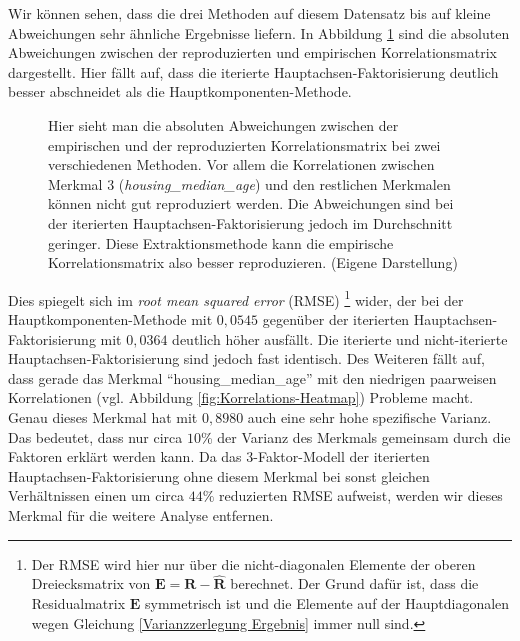 \documentclass[11pt]{scrartcl}
\begin{document}
	Wir können sehen, dass die drei Methoden auf diesem Datensatz bis auf kleine Abweichungen sehr ähnliche Ergebnisse liefern.
	In Abbildung \ref{fig:Residualmatrizen} sind die absoluten Abweichungen zwischen der reproduzierten und empirischen Korrelationsmatrix dargestellt. Hier fällt auf, dass die iterierte Hauptachsen-Faktorisierung deutlich besser abschneidet als die Hauptkomponenten-Methode.
	\begin{figure}[h]
		
		\caption[(Absolute) Residualmatrizen als Heatmap]{Hier sieht man die absoluten Abweichungen zwischen der empirischen und der reproduzierten Korrelationsmatrix bei zwei verschiedenen Methoden. Vor allem die Korrelationen zwischen Merkmal 3 (\textit{housing\_median\_age}) und
			den restlichen Merkmalen können nicht gut reproduziert werden. Die Abweichungen sind bei der iterierten Hauptachsen-Faktorisierung
			jedoch im Durchschnitt geringer. Diese Extraktionsmethode kann die empirische Korrelationsmatrix also besser reproduzieren.
			(Eigene Darstellung)}
		\label{fig:Residualmatrizen}
	\end{figure}
	Dies spiegelt sich im \textit{root mean squared error} (RMSE) \footnote{Der RMSE wird hier nur über die nicht-diagonalen Elemente der oberen Dreiecksmatrix von  $\mathbf{E} = \mathbf{R} - \widehat{\mathbf{R}}$ berechnet. Der Grund dafür ist, dass die Residualmatrix $\mathbf{E}$ symmetrisch ist und die Elemente auf der Hauptdiagonalen wegen Gleichung \ref{Varianzzerlegung Ergebnis} immer null sind.} wider, der bei der Hauptkomponenten-Methode mit $0{,}0545$ gegenüber der iterierten Hauptachsen-Faktorisierung mit $0{,}0364$ deutlich höher ausfällt. 
	Die iterierte und nicht-iterierte Hauptachsen-Faktorisierung sind jedoch fast identisch. Des Weiteren fällt auf, dass gerade das Merkmal \enquote{housing\_median\_age} mit den
	niedrigen paarweisen Korrelationen (vgl. Abbildung \ref{fig:Korrelations-Heatmap}) Probleme macht.
	Genau dieses Merkmal hat mit $0{,}8980$ auch eine sehr hohe spezifische Varianz. Das bedeutet,
	dass nur circa $10$\% der
	Varianz des Merkmals gemeinsam durch die Faktoren erklärt werden kann. Da das 3-Faktor-Modell der iterierten Hauptachsen-Faktorisierung ohne diesem Merkmal bei sonst gleichen Verhältnissen einen um circa $44\%$ reduzierten RMSE
	aufweist, werden wir dieses Merkmal für die weitere Analyse entfernen.
	
\end{document}
